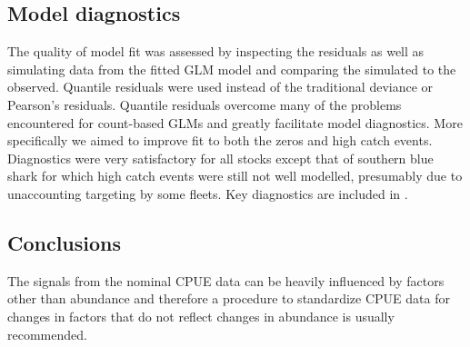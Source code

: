 
\subsection{Model diagnostics}
The quality of model fit was assessed by inspecting the residuals as well as simulating data from the fitted GLM model and comparing the simulated to the observed. 
Quantile residuals \citep{Dunn1996_a} were used instead of the traditional deviance or Pearson's residuals. Quantile residuals overcome many of the problems encountered for count-based GLMs and greatly facilitate model diagnostics. More specifically we aimed to improve fit to both the zeros and high catch events. Diagnostics were very satisfactory for all stocks except that of southern blue shark for which high catch events were still not well modelled, presumably due to unaccounting targeting by some fleets. Key diagnostics are included in .


\subsection{Conclusions}
The signals from the nominal  CPUE data can be heavily influenced by factors other than abundance and therefore a procedure to standardize CPUE data for changes in factors  that do not reflect changes in abundance is usually recommended. 

